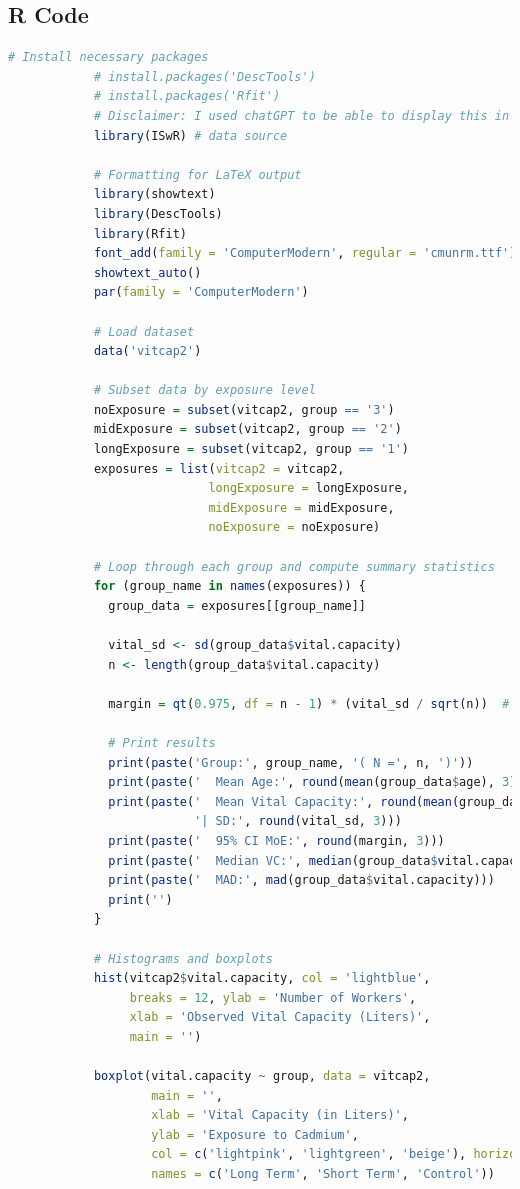 \documentclass{article}
\begin{document}
		\subsection*{R Code}
		\begin{lstlisting}[language=R, basicstyle=\footnotesize\ttfamily, breaklines=true]
			# Install necessary packages
			# install.packages('DescTools')
			# install.packages('Rfit')
			# Disclaimer: I used chatGPT to be able to display this in latex, hope that's okay
			library(ISwR) # data source
			
			# Formatting for LaTeX output
			library(showtext)
			library(DescTools)
			library(Rfit)
			font_add(family = 'ComputerModern', regular = 'cmunrm.ttf') # for consistent formatting in LaTeX
			showtext_auto()
			par(family = 'ComputerModern')
			
			# Load dataset
			data('vitcap2')
			
			# Subset data by exposure level
			noExposure = subset(vitcap2, group == '3')
			midExposure = subset(vitcap2, group == '2')
			longExposure = subset(vitcap2, group == '1')
			exposures = list(vitcap2 = vitcap2, 
							longExposure = longExposure,
							midExposure = midExposure, 
							noExposure = noExposure)
			
			# Loop through each group and compute summary statistics
			for (group_name in names(exposures)) {
			  group_data = exposures[[group_name]]
			  
			  vital_sd <- sd(group_data$vital.capacity)
			  n <- length(group_data$vital.capacity)
			  
			  margin = qt(0.975, df = n - 1) * (vital_sd / sqrt(n))  # margin for 95% CI
			  
			  # Print results
			  print(paste('Group:', group_name, '( N =', n, ')'))
			  print(paste('  Mean Age:', round(mean(group_data$age), 3))) 
			  print(paste('  Mean Vital Capacity:', round(mean(group_data$vital.capacity), 3),
						  '| SD:', round(vital_sd, 3)))
			  print(paste('  95% CI MoE:', round(margin, 3)))
			  print(paste('  Median VC:', median(group_data$vital.capacity)))
			  print(paste('  MAD:', mad(group_data$vital.capacity)))
			  print('')
			}
			
			# Histograms and boxplots
			hist(vitcap2$vital.capacity, col = 'lightblue', 
				 breaks = 12, ylab = 'Number of Workers',
				 xlab = 'Observed Vital Capacity (Liters)',
				 main = '')
			
			boxplot(vital.capacity ~ group, data = vitcap2, 
					main = '',
					xlab = 'Vital Capacity (in Liters)', 
					ylab = 'Exposure to Cadmium', 
					col = c('lightpink', 'lightgreen', 'beige'), horizontal = T,
					names = c('Long Term', 'Short Term', 'Control'))
			

\end{lstlisting}
\end{document}
